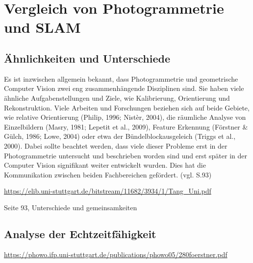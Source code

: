 \chapter{Vergleich von Photogrammetrie und SLAM}

\section{Ähnlichkeiten und Unterschiede}
Es ist inzwischen allgemein bekannt, dass Photogrammetrie und geometrische Computer Vision zwei eng zusammenhängende Disziplinen sind. Sie haben viele ähnliche Aufgabenstellungen und Ziele, wie Kalibrierung, Orientierung und Rekonstruktion. Viele Arbeiten und Forschungen beziehen sich auf beide Gebiete, wie relative Orientierung (Philip, 1996; Nistèr, 2004), die räumliche Analyse von Einzelbildern (Masry, 1981; Lepetit et al., 2009), Feature Erkennung  (Förstner \& Gülch, 1986;
Lowe, 2004) oder etwa der Bündelblockausgeleich  (Triggs et al., 2000). Dabei sollte beachtet werden, dass viele dieser Probleme erst in der Photogrammetrie untersucht und beschrieben worden sind und erst später in der Computer Vision signifikant weiter entwickelt wurden. Dies hat die Kommunikation zwischen beiden Fachbereichen gefördert. (vgl. \cite{ph_vs_cv} S.93)

\url{https://elib.uni-stuttgart.de/bitstream/11682/3934/1/Tang_Uni.pdf} 

Seite 93, Unterschiede und gemeinsamkeiten 

\section{Analyse der Echtzeitfähigkeit}


\url{https://phowo.ifp.uni-stuttgart.de/publications/phowo05/280foerstner.pdf}


